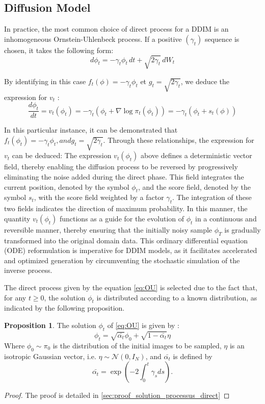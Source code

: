 \documentclass[a4paper,10pt]{article}
\theoremstyle{definition} %
\theoremstyle{definition} %
\newtheorem{proposition}[definition]{Proposition}
\theoremstyle{definition} %
\theoremstyle{definition} %
\begin{document}
\subsection{Diffusion Model}

In practice, the most common choice of direct process for a DDIM is an inhomogeneous Ornstein-Uhlenbeck process. If a positive $(\gamma_t)$ sequence is chosen, it takes the following form:
\begin{equation}\label{eq:OU}
    d\phi_t = -\gamma_t\phi_t \,dt + \sqrt{2\gamma_t}\,dW_t
\end{equation}


By identifying in this case $f_t(\phi) = -\gamma_t\phi_t$ et $ g_t = \sqrt{2\gamma_t}$, we deduce the expression for $v_t$ :
\begin{equation}\label{eq:backward}
    \frac{d\phi_t}{dt} = v_t(\phi_t) = -\gamma_t(\phi_t+\nabla \log \pi_t(\phi_t)) = -\gamma_t(\phi_t+s_t(\phi))
\end{equation}


In this particular instance, it can be demonstrated that $f_t (\phi_t) = -\gamma_t \phi_t,  and g_t = \sqrt{2\gamma_t}$. Through these relationships, the expression for $v_t$ can be deduced:
The expression $v_t (\phi_t)$ above defines a deterministic vector field, thereby enabling the diffusion process to be reversed by progressively eliminating the noise added during the direct phase. This field integrates the current position, denoted by the symbol $\phi_t$, and the score field, denoted by the symbol $s_t$, with the score field weighted by a factor $\gamma_t$. The integration of these two fields indicates the direction of maximum probability. In this manner, the quantity $v_t(\phi_t)$ functions as a guide for the evolution of $\phi_t$ in a continuous and reversible manner, thereby ensuring that the initially noisy sample $\phi_T$ is gradually transformed into the original domain data. This ordinary differential equation (ODE) reformulation is imperative for DDIM models, as it facilitates accelerated and optimized generation by circumventing the stochastic simulation of the inverse process.

The direct process given by the equation \eqref{eq:OU} is selected due to the fact that, for any $t \geq 0$, the solution $\phi_t$ is distributed according to a known distribution, as indicated by the following proposition.
\begin{proposition}\label{prop:solution_processus_direct}
    The solution $\phi_t$ of \eqref{eq:OU} is given by :
    \begin{equation}\label{eq:solforphi}
        \phi_t = \sqrt{\bar{\alpha_t}}\phi_0 + \sqrt{1-\bar{\alpha_t}}\eta
    \end{equation}
    Where $\phi_0 \sim \pi_0$ is the distribution of the initial images to be sampled, $\eta$ is an isotropic Gaussian vector, i.e. $\eta \sim \mathcal{N}(0, I_N)$, and $\bar{\alpha_t}$ is defined by 
    \[\bar{\alpha_t} = \exp{\left(-2\int_0^t \gamma_s ds\right)}.\]    
\end{proposition}
\begin{proof}
    The proof is detailed in \cref{sec:proof_solution_processus_direct}
\end{proof}
\end{document}
